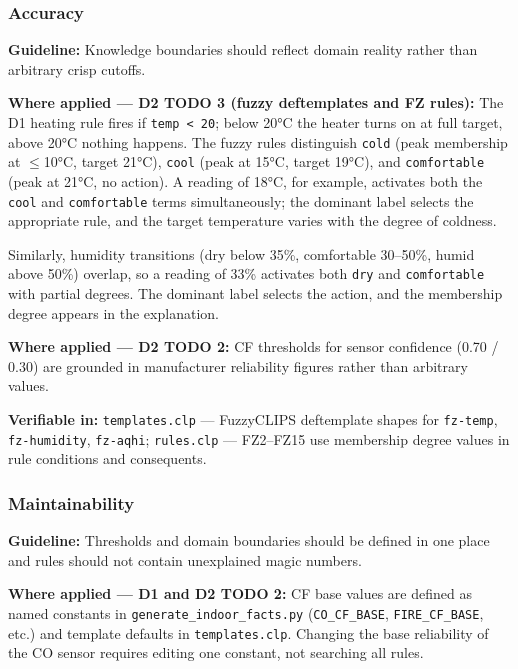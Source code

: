 \documentclass{article}
\begin{document}
\subsubsection{Accuracy}

\textbf{Guideline:} Knowledge boundaries should reflect domain reality rather than arbitrary crisp cutoffs.

\textbf{Where applied — D2 TODO 3 (fuzzy deftemplates and FZ rules):} The D1 heating rule fires if \texttt{temp < 20}; below 20°C the heater turns on at full target, above 20°C nothing happens. The fuzzy rules distinguish \texttt{cold} (peak membership at $\leq$10°C, target 21°C), \texttt{cool} (peak at 15°C, target 19°C), and \texttt{comfortable} (peak at 21°C, no action). A reading of 18°C, for example, activates both the \texttt{cool} and \texttt{comfortable} terms simultaneously; the dominant label selects the appropriate rule, and the target temperature varies with the degree of coldness.

Similarly, humidity transitions (dry below 35\%, comfortable 30–50\%, humid above 50\%) overlap, so a reading of 33\% activates both \texttt{dry} and \texttt{comfortable} with partial degrees. The dominant label selects the action, and the membership degree appears in the explanation.

\textbf{Where applied — D2 TODO 2:} CF thresholds for sensor confidence (0.70 / 0.30) are grounded in manufacturer reliability figures rather than arbitrary values.

\textbf{Verifiable in:} \texttt{templates.clp} — FuzzyCLIPS deftemplate shapes for \texttt{fz-temp}, \texttt{fz-humidity}, \texttt{fz-aqhi}; \texttt{rules.clp} — FZ2–FZ15 use membership degree values in rule conditions and consequents.

\subsubsection{Maintainability}

\textbf{Guideline:} Thresholds and domain boundaries should be defined in one place and rules should not contain unexplained magic numbers.

\textbf{Where applied — D1 and D2 TODO 2:} CF base values are defined as named constants in \texttt{generate\_indoor\_facts.py} (\texttt{CO\_CF\_BASE}, \texttt{FIRE\_CF\_BASE}, etc.) and template defaults in \texttt{templates.clp}. Changing the base reliability of the CO sensor requires editing one constant, not searching all rules.
\end{document}
